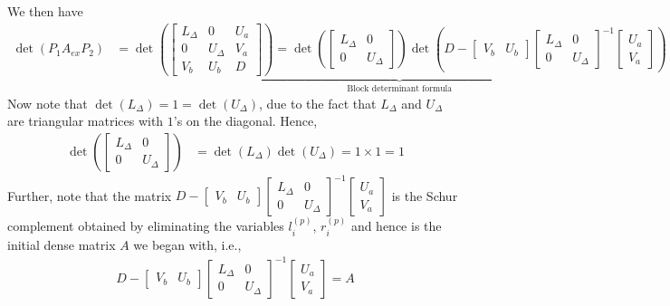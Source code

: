 \documentclass[times]{nlaauth}
\begin{document}
We then have
\begin{align}
\det(P_1A_{ex}P_2) & =
\underbrace{
\det\left(
\begin{bmatrix}
L_{\Delta} & 0 & U_a\\
0 & U_{\Delta} & V_a\\
V_b & U_b & D
\end{bmatrix}
\right) =
\det\left(
\begin{bmatrix}
L_{\Delta} & 0\\
0 & U_{\Delta}
\end{bmatrix}
\right)
\det\left(D-
\begin{bmatrix}
V_b & U_b
\end{bmatrix}
\begin{bmatrix}
L_{\Delta} & 0\\
0 & U_{\Delta}
\end{bmatrix}^{-1}
\begin{bmatrix}
U_a\\
V_a
\end{bmatrix}
\right)
}_{\text{Block determinant formula}}
\end{align}
Now note that $\det(L_{\Delta}) = 1 = \det(U_{\Delta})$, due to the fact that $L_{\Delta}$ and $U_{\Delta}$ are triangular matrices with $1$'s on the diagonal. Hence,
\begin{align}
\det\left(
\begin{bmatrix}
L_{\Delta} & 0\\
0 & U_{\Delta}
\end{bmatrix}
\right) & = \det(L_{\Delta}) \det(U_{\Delta}) = 1 \times 1 = 1
\end{align}
Further, note that the matrix $D-
\begin{bmatrix}
V_b & U_b
\end{bmatrix}
\begin{bmatrix}
L_{\Delta} & 0\\
0 & U_{\Delta}
\end{bmatrix}^{-1}
\begin{bmatrix}
U_a\\
V_a
\end{bmatrix}
$ is the Schur complement obtained by eliminating the variables $l_i^{(p)}$, $r_i^{(p)}$ and hence is the initial dense matrix $A$ we began with, i.e.,
\begin{align}
D-
\begin{bmatrix}
V_b & U_b
\end{bmatrix}
\begin{bmatrix}
L_{\Delta} & 0\\
0 & U_{\Delta}
\end{bmatrix}^{-1}
\begin{bmatrix}
U_a\\
V_a
\end{bmatrix} = A
\end{align}
\end{document}
